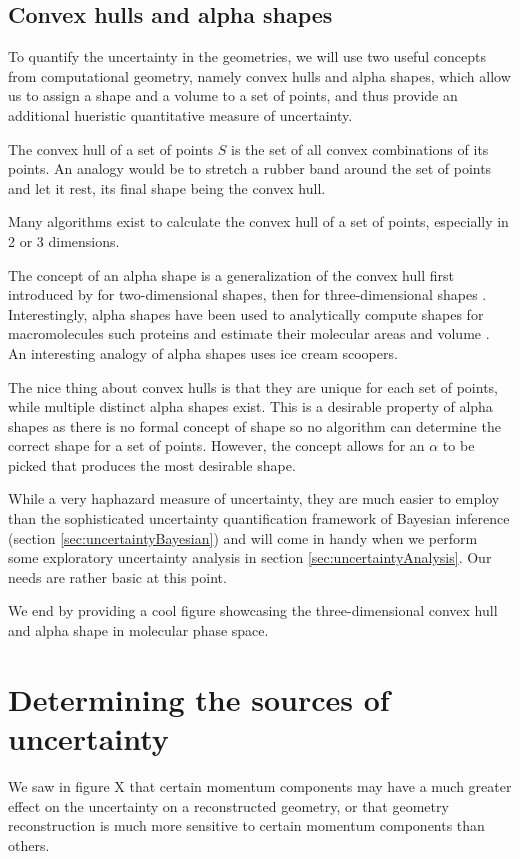 \subsection{Convex hulls and alpha shapes}
To quantify the uncertainty in the geometries, we will use two useful concepts from computational geometry, namely convex hulls and alpha shapes, which allow us to assign a shape and a volume to a set of points, and thus provide an additional hueristic quantitative measure of uncertainty.

The convex hull of a set of points $S$ is the set of all convex combinations of its points. An analogy would be to stretch a rubber band around the set of points and let it rest, its final shape being the convex hull.

Many algorithms exist to calculate the convex hull of a set of points, especially in 2 or 3 dimensions.

The concept of an alpha shape is a generalization of the convex hull first introduced by \citet{Edelsbrunner83} for two-dimensional shapes, then for three-dimensional shapes \citep{Edelsbrunner94}. Interestingly, alpha shapes have been used to analytically compute shapes for macromolecules such proteins and estimate their molecular areas and volume \citep{Liang98}. An interesting analogy of alpha shapes uses ice cream scoopers.

The nice thing about convex hulls is that they are unique for each set of points, while multiple distinct alpha shapes exist. This is a desirable property of alpha shapes as there is no formal concept of shape so no algorithm can determine the correct shape for a set of points. However, the concept allows for an $\alpha$ to be picked that produces the most desirable shape. 

While a very haphazard measure of uncertainty, they are much easier to employ than the sophisticated uncertainty quantification framework of Bayesian inference (section \ref{sec:uncertaintyBayesian}) and will come in handy when we perform some exploratory uncertainty analysis in section \ref{sec:uncertaintyAnalysis}. Our needs are rather basic at this point.

We end by providing a cool figure showcasing the three-dimensional convex hull and alpha shape in molecular phase space.


\section{Determining the sources of uncertainty}
We saw in figure X that certain momentum components may have a much greater effect on the uncertainty on a reconstructed geometry, or that geometry reconstruction is much more sensitive to certain momentum components than others.

